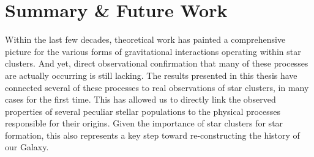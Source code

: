 \pagestyle{fancy}
\headheight 20pt
\chead{}
\lfoot{}
\cfoot{\thepage}
\rfoot{}
\renewcommand{\headrulewidth}{0.1pt}
\renewcommand{\footrulewidth}{0.1pt}

\chapter{Summary \& Future Work} \label{chapter7}
\thispagestyle{fancy}

%
%
Within the last few decades, theoretical work has painted a
comprehensive picture for the 
various forms of gravitational interactions operating within star
clusters.  
And yet, direct observational confirmation that many of these processes
are actually occurring is still lacking.  %
The results presented in 
this thesis have connected several of these processes to real
observations of star clusters, in many cases for the first time.  This
has allowed us to directly link the observed
properties of several peculiar stellar populations to the physical
processes responsible for their origins.  Given the importance of star
clusters for star formation, this also represents a key step toward
re-constructing the history of our Galaxy.  

